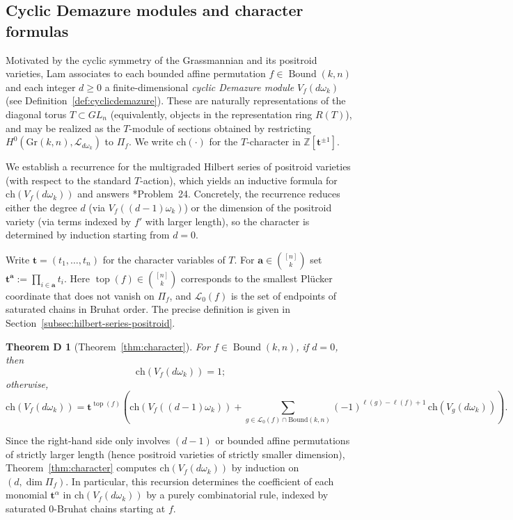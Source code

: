 \documentclass[12pt,reqno]{amsart}
\newtheorem*{thmD}{Theorem D}
\theoremstyle{definition}
\renewcommand{\aa}{\mathbf a}
\newcommand{\ch}{\mathrm{ch}}
\newcommand{\gr}{\mathrm{Gr}}
\newcommand{\topp}{\operatorname{top}}
\newcommand{\bound}{\operatorname{Bound}}
\newcommand{\Lenart}{\mathcal{L}}
\begin{document}
\subsection{Cyclic Demazure modules and character formulas}
Motivated by the cyclic symmetry of the Grassmannian and its positroid varieties, Lam \cite{Lam19} associates to each bounded affine permutation $f\in\bound(k,n)$
and each integer $d\ge 0$ a finite-dimensional \emph{cyclic Demazure module} $V_f(d\omega_k)$ (see Definition~\ref{def:cyclicdemazure}).
These are naturally representations of the diagonal torus $T\subset GL_n$ (equivalently, objects in the representation ring $R(T)$), and may be realized as the
$T$-module of sections obtained by restricting $H^0(\gr(k,n),\mathcal{L}_{d\omega_k})$ to $\Pi_f$.
We write $\ch(\cdot)$ for the $T$-character in $\mathbb{Z}[\mathbf{t}^{\pm1}]$.

We establish a recurrence for the multigraded Hilbert series of positroid varieties (with respect to the standard $T$-action), which yields an inductive formula for $\ch(V_f(d\omega_k))$ and answers \cite{Lam19}*{Problem~24}.
Concretely, the recurrence reduces either the degree $d$ (via $V_f((d-1)\omega_k)$) or the dimension of the positroid variety (via terms indexed by $f'$ with larger length), so the character is determined by induction starting from $d=0$.


Write $\mathbf{t}=(t_1,\dots,t_n)$ for the character variables of $T$.
For $\aa\in\binom{[n]}{k}$ set $\mathbf{t}^{\aa}:=\prod_{i\in\aa} t_i$. Here $\topp(f)\in\binom{[n]}{k}$ corresponds to the smallest Pl\"ucker coordinate that does not vanish on $\Pi_f$, and $\Lenart_0(f)$ is the set of endpoints of saturated chains in Bruhat order. The precise definition is given in Section~\ref{subsec:hilbert-series-positroid}. 


\begin{thmD}[Theorem~\ref{thm:character}]
For $f\in \bound(k,n)$, if $d=0$, then
\[
    \ch(V_f(d\omega_k)) = 1;
\]
otherwise,
\begin{equation}
\ch(V_f(d\omega_k))
=
\mathbf t^{\topp(f)}\left(
\ch(V_f((d-1)\omega_k))
+
\sum_{g\in \Lenart_0(f)\cap \mathrm{Bound}(k,n)}
(-1)^{\ell(g)-\ell(f)+1}\,
\ch(V_g(d\omega_k))
\right).
\end{equation}
\end{thmD}

Since the right-hand side only involves $(d-1)$ or bounded affine permutations of strictly larger length (hence positroid varieties of strictly smaller dimension),
Theorem~\ref{thm:character} computes $\ch(V_f(d\omega_k))$ by induction on $(d,\dim \Pi_f)$.
In particular, this recursion determines the coefficient of each monomial \(\mathbf t^\alpha\)
in \(\ch(V_f(d\omega_k))\) by a purely combinatorial rule, indexed by saturated \(0\)-Bruhat chains
starting at \(f\).
\end{document}
